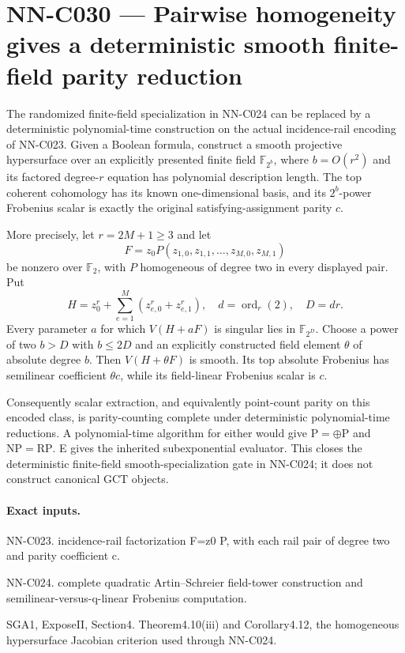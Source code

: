 \section{NN-C030 --- Pairwise homogeneity gives a deterministic smooth finite-field parity reduction}
\begin{proposition}[NN-C030]
The randomized finite-field specialization in NN-C024 can be replaced by a deterministic polynomial-time construction on the actual incidence-rail encoding of NN-C023. Given a Boolean formula, construct a smooth projective hypersurface over an explicitly presented finite field $\mathbb F_{2^b}$, where $b=O(r^2)$ and its factored degree-$r$ equation has polynomial description length. The top coherent cohomology has its known one-dimensional basis, and its $2^b$-power Frobenius scalar is exactly the original satisfying-assignment parity $c$.

More precisely, let $r=2M+1\geq3$ and let
\[
 F=z_0P(z_{1,0},z_{1,1},\ldots,z_{M,0},z_{M,1})
\]
be nonzero over $\mathbb F_2$, with $P$ homogeneous of degree two in every displayed pair. Put
\[
 H=z_0^r+\sum_{e=1}^M(z_{e,0}^r+z_{e,1}^r),
 \quad d=\operatorname{ord}_r(2),\quad D=dr.
\]
Every parameter $a$ for which $V(H+aF)$ is singular lies in $\mathbb F_{2^D}$. Choose a power of two $b>D$ with $b\leq2D$ and an explicitly constructed field element $\theta$ of absolute degree $b$. Then $V(H+\theta F)$ is smooth. Its top absolute Frobenius has semilinear coefficient $\theta c$, while its field-linear Frobenius scalar is $c$.

Consequently scalar extraction, and equivalently point-count parity on this encoded class, is parity-counting complete under deterministic polynomial-time reductions. A polynomial-time algorithm for either would give $\mathrm P=\oplus\mathrm P$ and $\mathrm{NP}=\mathrm{RP}$. E gives the inherited subexponential evaluator. This closes the deterministic finite-field smooth-specialization gate in NN-C024; it does not construct canonical GCT objects.
\end{proposition}
\paragraph{Exact inputs.}
NN-C023. incidence-rail factorization F=z0 P, with each rail pair of degree two and parity coefficient c.

NN-C024. complete quadratic Artin--Schreier field-tower construction and semilinear-versus-q-linear Frobenius computation.

SGA1, ExposeII, Section4. Theorem4.10(iii) and Corollary4.12, the homogeneous hypersurface Jacobian criterion used through NN-C024.

